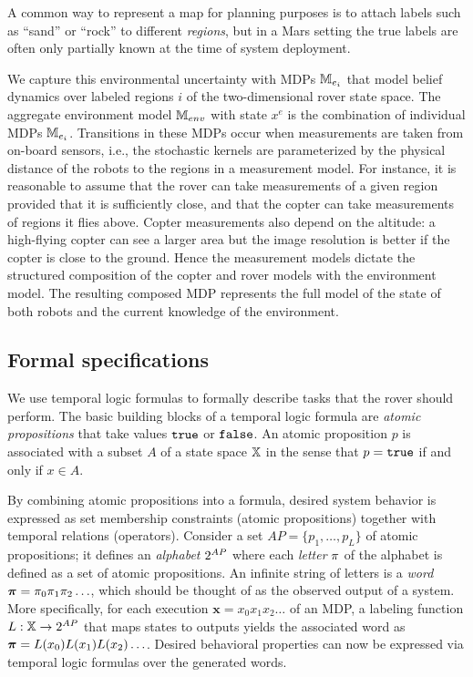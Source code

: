 \documentclass[conference]{IEEEtran}
\begin{document}
\smallskip
{}
A common way to represent a map for planning purposes is to attach labels such as ``sand'' or ``rock'' to different \emph{regions}, but in a Mars setting the true labels are often only partially known at the time of system deployment.

We capture this environmental uncertainty with MDPs $\mathbb{M}_{e_i}$ that model belief dynamics over labeled regions $i$ of the two-dimensional rover state space. The aggregate environment model $\mathbb{M}_{env}$ with state $x^e$ is the combination of individual MDPs $\mathbb{M}_{e_i}$. Transitions in these MDPs occur when measurements are taken from on-board sensors, i.e., the stochastic kernels are parameterized by the physical distance of the robots to the regions in a measurement model. For instance, it is reasonable to assume that the rover can take measurements of a given region provided that it is sufficiently close, and that the copter can take measurements of regions it flies above. Copter measurements also depend on the altitude: a high-flying copter can see a larger area but the image resolution is better if the copter is close to the ground. Hence the measurement models dictate the structured composition of the copter and rover models with the environment model. The resulting composed MDP represents the full model of the state of both robots and the current knowledge of the environment.


\subsection{Formal specifications}
We use temporal logic formulas to formally describe tasks that the rover should perform. The basic building blocks of a temporal logic formula are \emph{atomic propositions} that take values $\texttt{true}$ or $\texttt{false}$.  An atomic proposition $p$ is associated with a subset $A$ of a state space $\mathbb{X}$ in the sense that $p = \texttt{true}$ if and only if $x \in A$.

By combining atomic propositions into a formula, desired system behavior is expressed as set membership constraints (atomic propositions) together with temporal relations (operators). Consider a set $AP = \{ p_1, \ldots, p_L \}$ of atomic propositions; it defines an \emph{alphabet} ${2^{AP}}$ where each \emph{letter} $\pi$ of the alphabet is defined as a set of atomic propositions. An infinite string of letters is a \emph{word} $\boldsymbol{\pi}=\pi_0\pi_1\pi_2\ldots$, which should be thought of as the observed output of a system. More specifically, for each execution $\mathbf{x} = x_0 x_1 x_2 \ldots$ of an MDP, a labeling function $L: \mathbb{X} \rightarrow {2^{AP}}$ that maps states to outputs yields the associated word as $\boldsymbol{\pi} = L(x_0)L(x_1) L(x_2) \ldots$. Desired behavioral properties can now be expressed via temporal logic formulas over the generated words.
\end{document}
